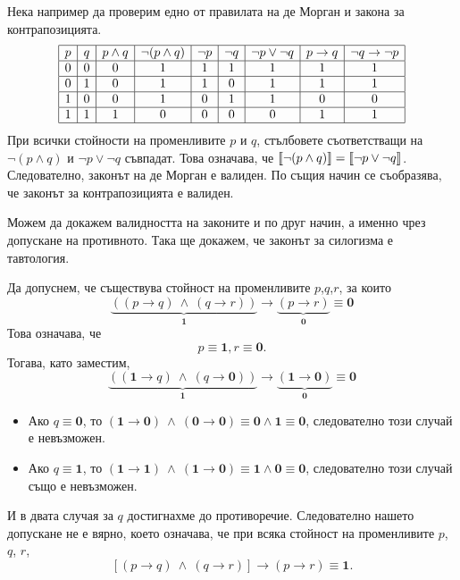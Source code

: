 \begin{example}
  Нека например да проверим едно от правилата на де Морган и закона
  за контрапозицията.
  \[
  \begin{array}{|c|c|c|c|c|c|c|c|c|}
    \hline
    p & q & p\wedge q & \neg(p\wedge q) & \neg p & \neg q & \neg p \vee \neg q & p \rightarrow q & \neg q \rightarrow \neg p\\
    \hline
    0 & 0 & 0 & 1 & 1 & 1 & 1 & 1 & 1 \\
    \hline
    0 & 1 & 0 & 1 & 1 & 0 & 1 & 1 & 1 \\
    \hline
    1 & 0 & 0 & 1 & 0 & 1 & 1 & 0 & 0 \\
    \hline
    1 & 1 & 1 & 0 & 0 & 0 & 0 & 1 & 1 \\
    \hline
  \end{array}
  \]
  При всички стойности на променливите $p$ и $q$, стълбовете съответстващи на $\neg(p \wedge q)$ и $\neg p \vee \neg q$
  съвпадат. Това означава, че $\llbracket{\neg(p \land q)}\rrbracket = \llbracket{\neg p \lor \neg q}\rrbracket$.  
  Следователно, законът на де Морган е валиден.
  По същия начин се съобразява, че законът за контрапозицията е валиден.
\end{example}


\begin{example}
  Можем да докажем валидността на законите и по друг начин, а именно чрез допускане на противното.
  Така ще докажем, че законът за силогизма е тавтология.
  
  Да допуснем, че съществува стойност на променливите $p$,$q$,$r$, за които
  \[\underbrace{((p\rightarrow q)\ \wedge\ (q\rightarrow r))}_{\mathbf{1}} \rightarrow \underbrace{(p\rightarrow r)}_{\mathbf{0}} \equiv {\mathbf 0}\]
  Това означава, че
  \[p \equiv \mathbf{1}, r \equiv \mathbf{0}.\]
  Тогава, като заместим,
  \[\underbrace{((\mathbf{1}\rightarrow q)\ \wedge\ (q\rightarrow \mathbf{0}))}_{\mathbf{1}} \rightarrow \underbrace{(\mathbf{1}\rightarrow \mathbf{0})}_{\mathbf{0}} \equiv {\mathbf 0}\]
  \begin{itemize}
  \item 
    Ако $q \equiv \mathbf{0}$, то $(\mathbf{1}\rightarrow \mathbf{0})\ \wedge\ (\mathbf{0}\rightarrow \mathbf{0}) \equiv \mathbf{0} \wedge \mathbf{1} \equiv \mathbf{0}$,
    следователно този случай е невъзможен.
  \item
    Ако $q \equiv \mathbf{1}$, то $(\mathbf{1}\rightarrow \mathbf{1})\ \wedge\ (\mathbf{1}\rightarrow \mathbf{0}) \equiv \mathbf{1} \wedge \mathbf{0} \equiv \mathbf{0}$,
    следователно този случай също е невъзможен.
  \end{itemize}
  И в двата случая за $q$ достигнахме до противоречие.
  Следователно нашето допускане не е вярно, което означава, че
  при всяка стойност на променливите $p$, $q$, $r$,
  \[[(p\rightarrow q)\ \wedge\ (q\rightarrow r)] \rightarrow (p\rightarrow r) \equiv {\mathbf 1}.\]
\end{example}

